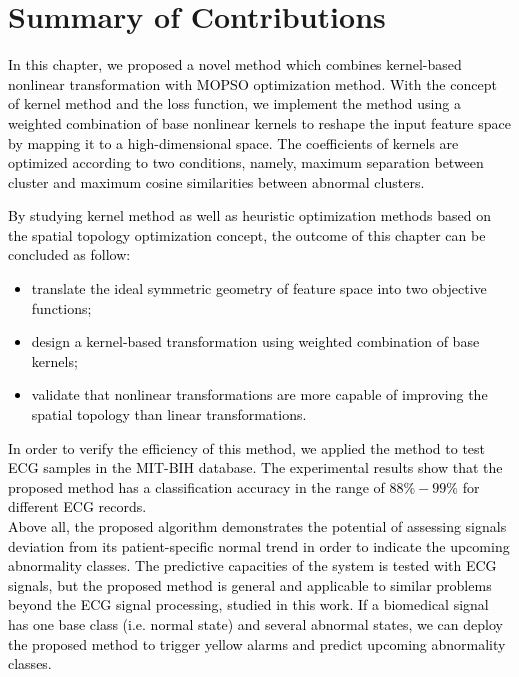 \section{Summary of Contributions} 

\textcolor{black}{In this chapter, we proposed a novel method which combines kernel-based nonlinear transformation with MOPSO optimization method. With the concept of kernel method and the loss function, we implement the method using a weighted combination of base nonlinear kernels to reshape the input feature space by mapping it to a high-dimensional space. The coefficients of kernels are optimized according to two conditions, namely, maximum separation between cluster and maximum cosine similarities between abnormal clusters.} \\
\textcolor{black}{By studying kernel method as well as heuristic optimization methods based on the spatial topology optimization concept, the outcome of this chapter can be concluded as follow:\\
\begin{itemize}
	\item translate the ideal symmetric geometry of feature space into two objective functions;
	\item design a kernel-based transformation using weighted combination of base kernels;
	\item validate that nonlinear transformations are more capable of improving the spatial topology than linear transformations.
\end{itemize}}

\textcolor{black}{%
In order to verify the efficiency of this method, we applied the method to test ECG samples in the MIT-BIH database\cite{mitdb}. The experimental results show that the proposed method has a classification accuracy in the range of $88\%-99\%$ for different ECG records.\\
Above all, the proposed algorithm demonstrates the potential of assessing signals deviation from its patient-specific normal trend in order to indicate the upcoming abnormality classes. The predictive capacities of the system is tested with ECG signals, but the proposed method is general and applicable to similar problems beyond the ECG signal processing, studied in this work. If a biomedical signal has one base class (i.e. normal state) and several abnormal states, we can deploy the proposed method to trigger yellow alarms and predict upcoming abnormality classes.}
  

